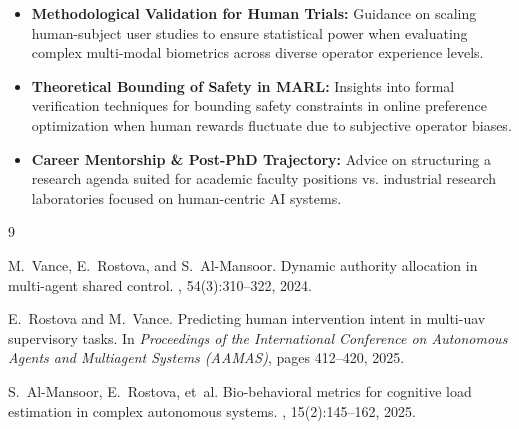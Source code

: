 \documentclass[11pt,a4paper]{scrartcl}
\begin{document}
\begin{itemize}[leftmargin=1.8em, itemsep=3pt]
    \item \textbf{Methodological Validation for Human Trials:} Guidance on scaling human-subject user studies to ensure statistical power when evaluating complex multi-modal biometrics across diverse operator experience levels.
    \item \textbf{Theoretical Bounding of Safety in MARL:} Insights into formal verification techniques for bounding safety constraints in online preference optimization when human rewards fluctuate due to subjective operator biases.
    \item \textbf{Career Mentorship \& Post-PhD Trajectory:} Advice on structuring a research agenda suited for academic faculty positions vs. industrial research laboratories focused on human-centric AI systems.
\end{itemize}

\vspace{12pt}

\begin{thebibliography}{9}
\sffamily\small

M.~Vance, E.~Rostova, and S.~Al-Mansoor.
\newblock Dynamic authority allocation in multi-agent shared control.
, 54(3):310--322, 2024.

E.~Rostova and M.~Vance.
\newblock Predicting human intervention intent in multi-uav supervisory tasks.
\newblock In {\em Proceedings of the International Conference on Autonomous Agents and Multiagent Systems (AAMAS)}, pages 412--420, 2025.

S.~Al-Mansoor, E.~Rostova, et~al.
\newblock Bio-behavioral metrics for cognitive load estimation in complex autonomous systems.
, 15(2):145--162, 2025.

\end{thebibliography}
\end{document}
